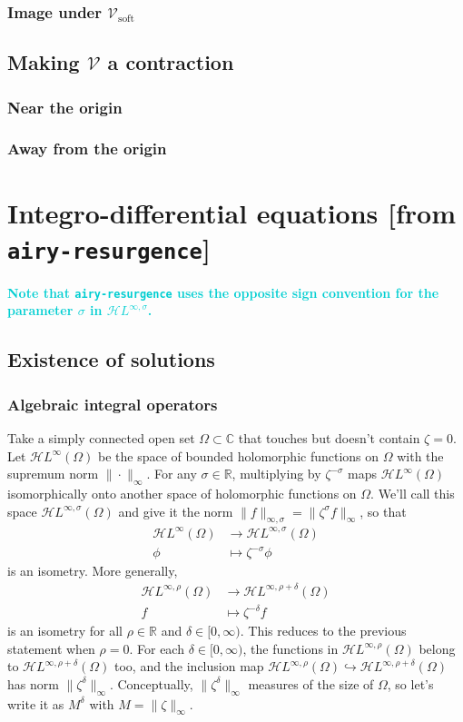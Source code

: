 \documentclass{article}
\theoremstyle{plain}
\newcommand{\R}{\mathbb{R}}
\newcommand{\C}{\mathbb{C}}
\newcommand{\holoL}[1]{\mathcal{H}L^{#1}} %
\newcommand{\volterra}{\mathcal{V}}
\newcommand{\softpart}{\mathcal{V}_\text{soft}}
\begin{document}
\subsubsection{Image under $\softpart$}
\subsection{Making $\volterra$ a contraction}
\subsubsection{Near the origin}
\subsubsection{Away from the origin}
\color{SteelBlue}
\section{Integro-differential equations {[from {\tt airy-resurgence}]}}
\textcolor{DarkTurquoise}{\textbf{Note that {\tt airy-resurgence} uses the opposite sign convention for the parameter $\sigma$ in $\holoL{\infty, \sigma}$.}}
\subsection{Existence of solutions}
\subsubsection{Algebraic integral operators}
Take a simply connected open set $\Omega \subset \C$ that touches but doesn't contain $\zeta = 0$. Let $\holoL{\infty}(\Omega)$ be the space of bounded holomorphic functions on $\Omega$ with the supremum norm $\|\cdot\|_\infty$. For any $\sigma \in \R$, multiplying by $\zeta^{-\sigma}$ maps $\holoL{\infty}(\Omega)$ isomorphically onto another space of holomorphic functions on $\Omega$. We'll call this space $\holoL{\infty, \sigma}(\Omega)$ and give it the norm $\|f\|_{\infty, \sigma} = \|\zeta^\sigma f\|_\infty$, so that
\begin{align*}
\holoL{\infty}(\Omega) & \to \holoL{\infty, \sigma}(\Omega) \\
\phi & \mapsto \zeta^{-\sigma} \phi
\end{align*}
is an isometry. More generally,
\begin{align*}
\holoL{\infty, \rho}(\Omega) & \to \holoL{\infty, \rho+\delta}(\Omega) \\
f & \mapsto \zeta^{-\delta} f
\end{align*}
is an isometry for all $\rho \in \R$ and $\delta \in [0, \infty)$. This reduces to the previous statement when $\rho = 0$. For each $\delta \in [0, \infty)$, the functions in $\holoL{\infty, \rho}(\Omega)$ belong to $\holoL{\infty, \rho+\delta}(\Omega)$ too, and the inclusion map $\holoL{\infty, \rho}(\Omega) \hookrightarrow \holoL{\infty, \rho+\delta}(\Omega)$ has norm $\|\zeta^\delta\|_\infty$. Conceptually, $\|\zeta^\delta\|_\infty$ measures of the size of $\Omega$, so let's write it as $M^\delta$ with $M = \|\zeta\|_\infty$.
\end{document}
